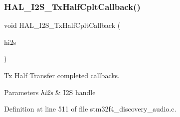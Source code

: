 \subsubsection{\texorpdfstring{H\+A\+L\+\_\+\+I2\+S\+\_\+\+Tx\+Half\+Cplt\+Callback()}{HAL\_I2S\_TxHalfCpltCallback()}}
{\footnotesize\ttfamily void H\+A\+L\+\_\+\+I2\+S\+\_\+\+Tx\+Half\+Cplt\+Callback (\begin{DoxyParamCaption}\item[{I2\+S\+\_\+\+Handle\+Type\+Def $\ast$}]{hi2s }\end{DoxyParamCaption})}



Tx Half Transfer completed callbacks. 


\begin{DoxyParams}{Parameters}
{\em hi2s} & I2S handle \\
\hline
\end{DoxyParams}


Definition at line 511 of file stm32f4\+\_\+discovery\+\_\+audio.\+c.

